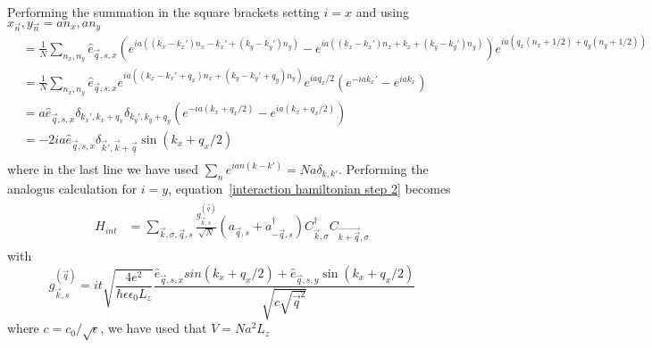 \documentclass{article}
\begin{document}
Performing the summation in the square brackets setting $i = x$ and using $x_{\vec{n}},y_{\vec{n}} = a n_x, a n_y$
\begin{align}
    [...] &= \frac{1}{N}\sum_{n_x, n_y} \hat{e}_{\vec{q},s,x} ( e^{i a\left((k_x - k_x') n_x - k_x' + (k_y - k_y') n_y \right)} -  e^{i a\left((k_x - k_x') n_x + k_x + (k_y - k_y') n_y \right)}) e^{i a \left(q_x \left(n_x + 1/2\right) + q_y (n_y + 1/2)\right)}\\
          &= \frac{1}{N}\sum_{n_x, n_y} \hat{e}_{\vec{q},s,x} e^{i a\left((k_x - k_x' + q_x) n_x + (k_y - k_y' + q_y) n_y \right)} e^{ia q_x / 2} ( e^{- i a k_x' } -  e^{i a k_x })\\
          &= a \hat{e}_{\vec{q},s,x} \delta_{k_x',k_x + q_x} \delta_{k_y',k_y + q_y}  ( e^{- i a (k_x + q_x /2) } -  e^{i a (k_x + q_x/2)  })\\
          &=   -2 i a \hat{e}_{\vec{q},s,x} \delta_{\vec{k}',\vec{k} + \vec{q}} \sin(k_x + q_x /2)\\
\end{align}
where in the last line we have used $\sum_n e^{ian(k - k')} = N a \delta_{k,k'}$. Performing the analogus calculation for $i = y$, equation~\ref{interaction hamiltonian step 2} becomes
\begin{align}
\begin{split}
    H_{int} &=  \sum_{\vec{k},\sigma,\vec{q},s} \frac{g_{\vec{k},s}^{(\vec{q})}}{\sqrt{N}} \left(a_{\vec{q},s} + a_{-\vec{q}, s}^{\dagger}\right) C_{\vec{k},\sigma}^{\dagger} C_{\vec{k + \vec{q}},\sigma} 
    \end{split}
\end{align}
with 
\begin{equation}
   g_{\vec{k},s}^{(\vec{q})} = i t \sqrt{\frac{4 e^2}{\hbar \epsilon \epsilon_0 L_z}} \frac{\hat{e}_{\vec{q},s,x} sin(k_x + q_x /2) + \hat{e}_{\vec{q},s,y} \sin(k_x + q_x /2)}{\sqrt{c \sqrt{\vec{q}^2}}}
\end{equation}
where $c = c_0 / \sqrt{\epsilon}$, we have used that $V = N a^2 L_z$

\printbibliography
\end{document}

